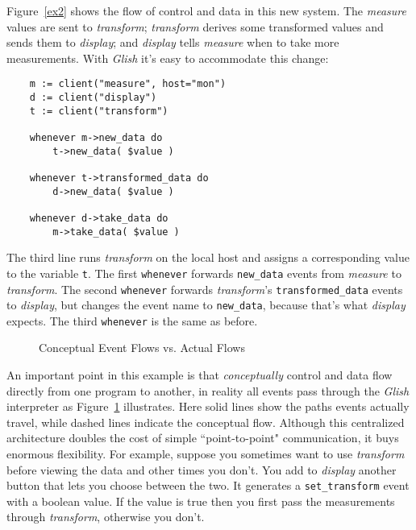 Figure~\ref{ex2} shows the flow of control and data in this new system.
The {\em measure} values are sent to {\em transform\/}; {\em transform}
derives some transformed values and sends them to {\em display\/};
and {\em display} tells {\em measure} when to take more measurements.
With {\em Glish} it's easy to accommodate this
change:
\begin{verbatim}
    m := client("measure", host="mon")
    d := client("display")
    t := client("transform")

    whenever m->new_data do
        t->new_data( $value )

    whenever t->transformed_data do
        d->new_data( $value )

    whenever d->take_data do
        m->take_data( $value )
\end{verbatim}
The third line runs {\em transform} on the local host and assigns a
corresponding value to the variable {\tt t}.  The first {\tt whenever}
forwards {\tt new\_data} events from {\em measure} to
{\em transform\/}. The second {\tt whenever} forwards
{\em transform\/}'s {\tt transformed\_data} events to {\em display\/},
but changes the event name to {\tt new\_data}, because that's what
{\em display} expects.  The third {\tt whenever} is the same as before.

\begin{figure}[thb]
\centerline{}
\caption{ Conceptual Event Flows vs. Actual Flows }
\label{ex3}
\end{figure}

An important point in  this example is that {\em conceptually} control and
data flow directly from one program to another, in reality all events pass
through the {\em Glish} interpreter as 
Figure~\ref{ex3} illustrates.  Here solid lines show the paths  events actually
travel, while dashed lines indicate the conceptual
flow.  Although  this
centralized architecture doubles the cost of simple ``point-to-point"
communication, it
buys enormous flexibility.  For example, suppose you sometimes  want to
use {\em transform} before viewing the data and other times you don't.
You add to {\em display} another button that lets you choose between
the two.  It generates a {\tt set\_transform} event with a boolean value.
If the value is true then you first pass the measurements through
{\em transform\/}, otherwise you don't.

